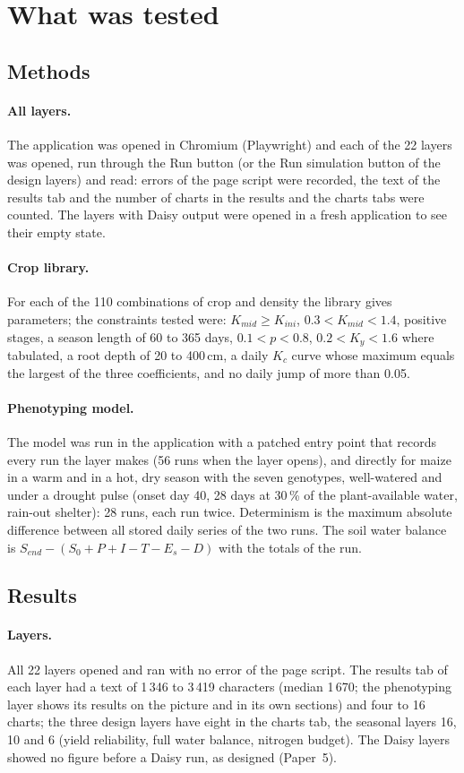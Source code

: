 \section{What was tested}
\subsection{Methods}
\paragraph{All layers.} The application was opened in Chromium (Playwright) and each of the 22 layers was opened, run through the Run button (or the Run simulation button of the design layers) and read: errors of the page script were recorded, the text of the results tab and the number of charts in the results and the charts tabs were counted. The layers with Daisy output were opened in a fresh application to see their empty state.

\paragraph{Crop library.} For each of the 110 combinations of crop and density the library gives parameters; the constraints tested were: $K_{mid}\ge K_{ini}$, $0.3<K_{mid}<1.4$, positive stages, a season length of 60 to 365 days, $0.1<p<0.8$, $0.2<K_y<1.6$ where tabulated, a root depth of 20 to 400\,cm, a daily $K_c$ curve whose maximum equals the largest of the three coefficients, and no daily jump of more than 0.05.

\paragraph{Phenotyping model.} The model was run in the application with a patched entry point that records every run the layer makes (56 runs when the layer opens), and directly for maize in a warm and in a hot, dry season with the seven genotypes, well-watered and under a drought pulse (onset day 40, 28 days at 30\,\% of the plant-available water, rain-out shelter): 28 runs, each run twice. Determinism is the maximum absolute difference between all stored daily series of the two runs. The soil water balance is $S_{end}-(S_0+P+I-T-E_s-D)$ with the totals of the run.

\subsection{Results}
\paragraph{Layers.} All 22 layers opened and ran with no error of the page script. The results tab of each layer had a text of 1\,346 to 3\,419 characters (median 1\,670; the phenotyping layer shows its results on the picture and in its own sections) and four to 16 charts; the three design layers have eight in the charts tab, the seasonal layers 16, 10 and 6 (yield reliability, full water balance, nitrogen budget). The Daisy layers showed no figure before a Daisy run, as designed (Paper~5).

